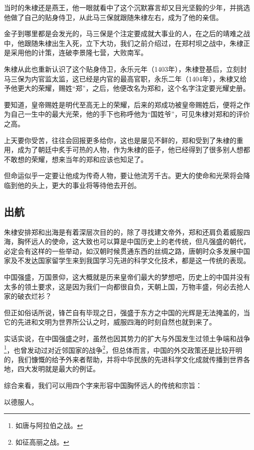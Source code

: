 \begin{multicols}{\theparacolNo}
当时的朱棣还是燕王，他一眼就看中了这个沉默寡言却又目光坚毅的少年，并挑选他做了自己的贴身侍卫，从此马三保就跟随朱棣左右，成为了他的亲信。

金子到哪里都是会发光的，马三保是个注定要成就大事业的人，在之后的靖难之战中，他跟随朱棣出生入死，立下大功，我们之前介绍过，在郑村坝之战中，朱棣正是采用他的计策，连破李景隆七营，大败南军。

朱棣从此也重新认识了这个贴身侍卫，永乐元年（1403年），朱棣登基后，立刻封马三保为内官监太监，这已经是内官的最高官职，永乐二年（1404年），朱棣又给予他更大的荣耀，赐姓“郑”，之后，他便改名为郑和，这个名字注定要光耀史册。

要知道，皇帝赐姓是明代至高无上的荣耀，后来的郑成功被皇帝赐姓后，便将之作为自己一生中的最大光荣，他的手下也称呼他为“国姓爷”，可见朱棣对郑和的评价之高。

上天要你受苦，往往会回报更多给你，这也是屡见不鲜的，郑和受到了朱棣的重用，成为了朝廷中炙手可热的人物，作为朱棣的臣子，他已经得到了很多别人想都不敢想的荣耀，想来当年的郑和应该也知足了。

但命运似乎一定要让他成为传奇人物，要让他流芳千古。更大的使命和光荣将会降临到他的头上，更大的事业将等待他去开创。

\subsection{出航}
朱棣安排郑和出海是有着深层次目的的，除了寻找建文帝外，郑和还肩负着威服四海，胸怀远人的使命，这大致也可以算是中国历史上的老传统，但凡强盛的朝代，必定会有这样的一些举动，如汉朝时候贯通东西的丝绸之路，唐朝时众多发展中国家及不发达国家留学生来到我国学习先进的科学文化技术，都是这一传统的表现。

中国强盛，万国景仰，这大概就是历来皇帝们最大的梦想吧，历史上的中国并没有太多的领土要求，这是因为我们一向都很自负，天朝上国，万物丰盛，何必去抢人家的破衣烂衫？

但正如俗话所说，锋芒自有毕现之日，强盛于东方之中国的光辉是无法掩盖的，当它的先进和文明为世界所公认之时，威服四海的时刻自然也就到来了。

实话实说，在中国强盛之时，虽然也因其势力的扩大与外国发生过领土争端和战争\footnote{如唐与阿拉伯之战。}，也曾发动过对近邻国家的战争\footnote{如征高丽之战。}，但总体而言，中国的外交政策还是比较开明的，我们慷慨的给予外来者帮助，并将中华民族的先进科学文化成就传播到世界各地，四大发明就是最大的例证。

综合来看，我们可以用四个字来形容中国胸怀远人的传统和宗旨：

以德服人。


\end{multicols}
